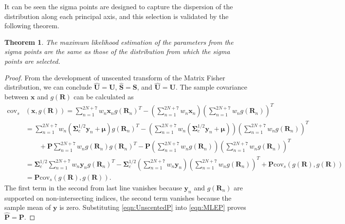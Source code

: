 \documentclass[12pt]{article}
\newtheorem{theorem}{Theorem}
\begin{document}
It can be seen the sigma points are designed to capture the dispersion of the distribution along each principal axis, and this selection is validated by the following theorem.
\begin{theorem}
	The maximum likelihood estimation of the parameters from the sigma points are the same as those of the distribution from which the sigma points are selected.
\end{theorem}
\begin{proof}
	From the development of unscented transform of the Matrix Fisher distribution, we can conclude $\hat{\mathbf{U}}=\mathbf{U}$, $\hat{\mathbf{S}}=\mathbf{S}$, and $\hat{\mathbf{U}}=\mathbf{U}$.
	The sample covariance between $\bm{x}$ and $g(\mathbf{R})$ can be calculated as
	\begin{align} \label{eqn:UnscentedP}
		\mathrm{cov}_s&(\bm{x},g(\mathbf{R})) = \sum_{n=1}^{2N+7}w_n\bm{x}_ng(\mathbf{R}_n)^T - \left(\sum_{n=1}^{2N+7}w_n\bm{x}_n\right)\left(\sum_{n=1}^{2N+7}w_ng(\mathbf{R}_n)\right)^T \nonumber \\
		&=\sum_{n=1}^{2N+7}w_n\left(\mathbf{\Sigma}_c^{1/2}\bm{y}_n+\bm{\mu}\right)g(\mathbf{R}_n)^T - \left(\sum_{n=1}^{2N+7}w_n\left(\mathbf{\Sigma}_c^{1/2}\bm{y}_n+\bm{\mu}\right)\right)\left(\sum_{n=1}^{2N+7}w_ng(\mathbf{R}_n)\right)^T \nonumber \\
		&\qquad + \mathbf{P}\sum_{n=1}^{2N+7}w_ng(\mathbf{R}_n)g(\mathbf{R}_n)^T - \mathbf{P}\left(\sum_{n=1}^{2N+7}w_ng(\mathbf{R}_n)\right)\left(\sum_{n=1}^{2N+7}w_ng(\mathbf{R}_n)\right)^T \nonumber \\
		&=\mathbf{\Sigma}_c^{1/2}\sum_{n=1}^{2N+7}w_n\bm{y}_ng(\mathbf{R}_n)^T - \mathbf{\Sigma}_c^{1/2}\left(\sum_{n=1}^{2N+7}w_n\bm{y}_n\right)\left(\sum_{n=1}^{2N+7}w_ng(\mathbf{R}_n)\right)^T + \mathbf{P}\mathrm{cov}_s(g(\mathbf{R}),g(\mathbf{R})) \nonumber \\
		&=\mathbf{P}\mathrm{cov}_s(g(\mathbf{R}),g(\mathbf{R})).
	\end{align}
	The first term in the second from last line vanishes because $\bm{y}_n$ and $g(\mathbf{R}_n)$ are supported on non-intersecting indices, the second term vanishes because the sample mean of $\bm{y}$ is zero.
	Substituting \eqref{eqn:UnscentedP} into \eqref{eqn:MLEP} proves $\hat{\mathbf{P}} = \mathbf{P}$.
	

\end{proof}
\end{document}
